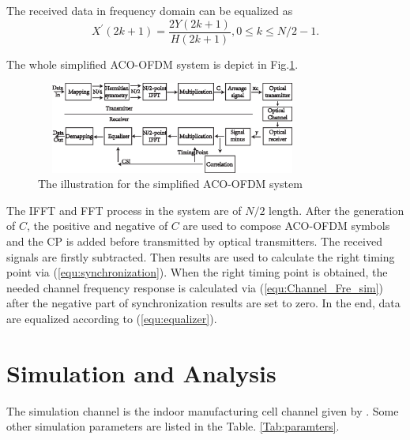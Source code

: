\documentclass[10pt,journal]{IEEEtran}
\begin{document}
    The received data in frequency domain can be equalized as
    \begin{equation}\label{equ:equalizer}
       X^{'}(2k+1)=\dfrac{2Y(2k+1)}{H(2k+1)},0\leq k\leq N/2-1.
    \end{equation}

    The whole simplified ACO-OFDM system is depict in Fig.\ref{fig:sim_ACO_OFDM_system}.
    \begin{figure}[!htb]
        \captionsetup{belowskip=-5pt}
    	\centering \includegraphics[width=9cm,height=3cm]{ACO_OFDM_system.eps}
		\caption{The illustration for the simplified ACO-OFDM system} \label{fig:sim_ACO_OFDM_system}
    \end{figure}
    The IFFT and FFT process in the system are of $ N/2 $ length. After the generation of $ C $, the positive and negative of $ C $ are used to compose ACO-OFDM symbols and the CP is added before transmitted by optical transmitters. The received signals are firstly subtracted. Then results are used to calculate the right timing point via (\ref{equ:synchronization}). When the right timing point is obtained, the needed channel frequency response is calculated via (\ref{equ:Channel_Fre_sim}) after the negative part of synchronization results are set to zero. In the end, data are equalized according to (\ref{equ:equalizer}).



\section{Simulation and Analysis}
	The simulation channel is the indoor manufacturing cell channel given by \cite{Uysal2015Lifi}. Some other simulation parameters are listed in the Table. \ref{Tab:paramters}.
\end{document}
